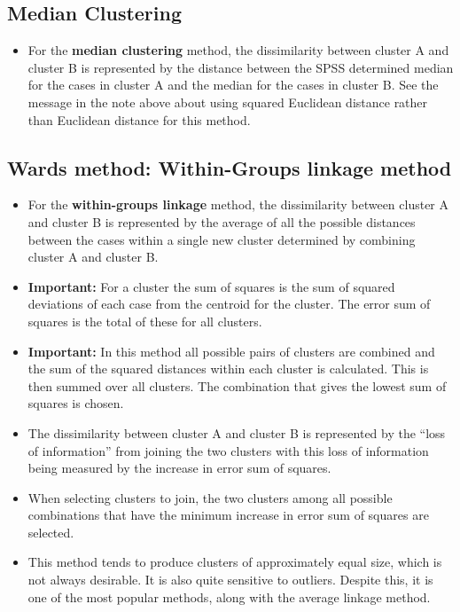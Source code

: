 \documentclass[a4paper,12pt]{article}
\begin{document}
\subsection{Median Clustering}

\begin{itemize}
	\item 
	For the \textbf{median clustering} method, the dissimilarity between cluster A and cluster B is represented by the distance between the SPSS determined median for the cases in cluster A and the median for the cases in cluster B.  See the message in the note above about using squared Euclidean distance rather than Euclidean distance for this method.
	
\end{itemize}
	
%	
	


\subsection{Wards method: Within-Groups linkage method}
\begin{itemize}
	
	\item For the \textbf{within-groups linkage} method, the dissimilarity between cluster A and cluster B is represented by the average of all the possible distances between the cases within a single new cluster determined by combining cluster A and cluster B.
	 \item \textbf{Important:} For a cluster the sum of squares is the sum of squared deviations of each case from the centroid for the cluster.  The error sum of squares is the total of these for all clusters. 
	\item \textbf{Important:} In this method all possible pairs of clusters are combined and the sum of the squared
	distances within each cluster is calculated. This is then summed over all clusters. The
	combination that gives the lowest sum of squares is chosen. 

	\item The dissimilarity between cluster A and cluster B is represented by the “loss of information” from joining the two clusters with this loss of information being measured by the increase in error sum of squares.  
	\item When selecting clusters to join, the two clusters among all possible combinations that have the minimum increase in error sum of squares are selected.  
		\item This method tends to
		produce clusters of approximately equal size, which is not always desirable. It is also
		quite sensitive to outliers. Despite this, it is one of the most popular methods, along
		with the average linkage method.
\end{itemize}	
\end{document}
